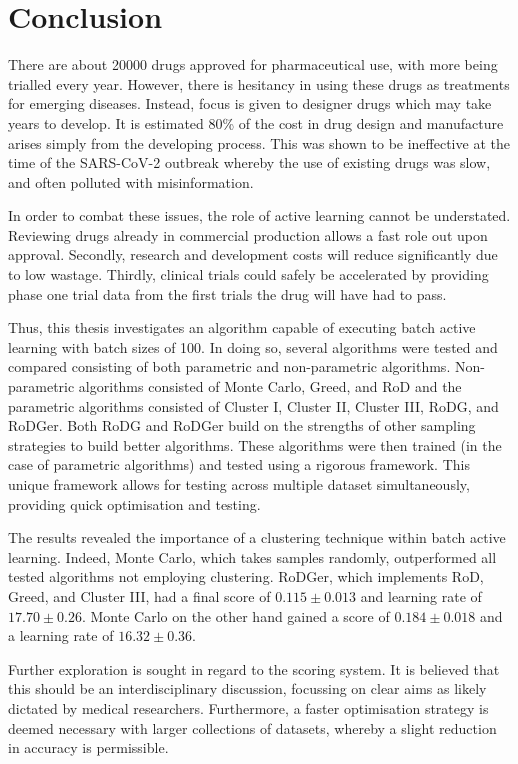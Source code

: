 \chapter{Conclusion}


\graphicspath{{Chapter6/Figs/Vector/}{Chapter6/Figs/}}




There are about 20000 drugs approved for pharmaceutical use, with more being trialled every year. However, there is hesitancy in using these drugs as treatments for emerging diseases. Instead, focus is given to designer drugs which may take years to develop. It is estimated 80\% of the cost in drug design and manufacture arises simply from the developing process. This was shown to be ineffective at the time of the SARS-CoV-2 outbreak whereby the use of existing drugs was slow, and often polluted with misinformation.

In order to combat these issues, the role of active learning cannot be understated. Reviewing drugs already in commercial production allows a fast role out upon approval. Secondly, research and development costs will reduce significantly due to low wastage. Thirdly, clinical trials could safely be accelerated by providing phase one trial data from the first trials the drug will have had to pass.

Thus, this thesis investigates an algorithm capable of executing batch active learning with batch sizes of 100. In doing so, several algorithms were tested and compared consisting of both parametric and non-parametric algorithms. Non-parametric algorithms consisted of Monte Carlo, Greed, and RoD and the parametric algorithms consisted of Cluster I, Cluster II, Cluster III, RoDG, and RoDGer. Both RoDG and RoDGer build on the strengths of other sampling strategies to build better algorithms. These algorithms were then trained (in the case of parametric algorithms) and tested using a rigorous framework. This unique framework allows for testing across multiple dataset simultaneously, providing quick optimisation and testing.

The results revealed the importance of a clustering technique within batch active learning. Indeed, Monte Carlo, which takes samples randomly, outperformed all tested algorithms not employing clustering. RoDGer, which implements RoD, Greed, and Cluster III, had a final score of $0.115\pm{}0.013$ and learning rate of $17.70\pm{}0.26$. Monte Carlo on the other hand gained a score of $0.184\pm{}0.018$ and a learning rate of $16.32\pm{}0.36$.

Further exploration is sought in regard to the scoring system. It is believed that this should be an interdisciplinary discussion, focussing on clear aims as likely dictated by medical researchers. Furthermore, a faster optimisation strategy is deemed necessary with larger collections of datasets, whereby a slight reduction in accuracy is permissible.